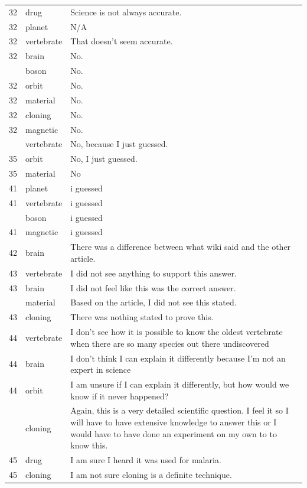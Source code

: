 \documentclass[
  doc,floatsintext]{apa6}
\begin{document}
\begin{longtable}[t]{>{}r>{}l>{\raggedright\arraybackslash}p{30em}}
32 & drug & Science is not always accurate.\\
32 & planet & N/A\\
32 & vertebrate & That doesn't seem accurate.\\
32 & brain & No.\\
\addlinespace
32 & boson & No.\\
32 & orbit & No.\\
32 & material & No.\\
32 & cloning & No.\\
32 & magnetic & No.\\
\addlinespace
35 & vertebrate & No, because I just guessed.\\
35 & orbit & No, I just guessed.\\
35 & material & No\\
41 & planet & i guessed\\
41 & vertebrate & i guessed\\
\addlinespace
41 & boson & i guessed\\
41 & magnetic & i guessed\\
42 & brain & There was a difference between what wiki said and the other article.\\
43 & vertebrate & I did not see anything to support this answer.\\
43 & brain & I did not feel like this was the correct answer.\\
\addlinespace
43 & material & Based on the article, I did not see this stated.\\
43 & cloning & There was nothing stated to prove this.\\
44 & vertebrate & I don’t see how it is possible to know the oldest vertebrate when there are so many species out there undiscovered\\
44 & brain & I don’t think I can explain it differently because I’m not an expert in science\\
44 & orbit & I am unsure if I can explain it differently, but how would we know if it never happened?\\
\addlinespace
44 & cloning & Again, this is a very detailed scientific question. I feel it so I will have to have extensive knowledge to answer this or I would have to have done an experiment on my own to to know this.\\
45 & drug & I am sure I heard it was used for malaria.\\
45 & cloning & I am not sure cloning is a definite technique.\\

\end{longtable}
\end{document}
